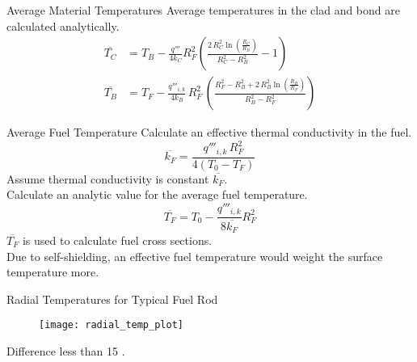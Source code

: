 \begin{frame}{Average Material Temperatures}
  Average temperatures in the clad and bond are calculated analytically.
  \begin{align}
    \label{eq:tc_bar}
    \overline{T_C} &= T_B - \frac{q'''}{4 k_C} R_F^2 \left(
      \frac{2 \, R_C^2 \ln\left(\frac{R_C}{R_B}\right)}
      {R_C^2 - R_B^2}  - 1\right) \\
    \label{eq:tb_bar}
    \overline{T_B} &= T_F - \frac{q'''_{i,k}}{4 k_B} \, R_F^2 \, \left(
      \frac{R_F^2 - R_B^2 + 2\,R_B^2 \ln\left(\frac{R_B}{R_F}\right)}
      {R_B^2-R_F^2}\right)
  \end{align}
\end{frame}

\begin{frame}{Average Fuel Temperature}
  Calculate an effective thermal conductivity in the fuel.
  \begin{equation}
    \label{eq:kfuel_constant}
    \overline{k_F} = \frac{q'''_{i,k} \, R_F^2}{4(T_0-T_F)}
  \end{equation}
  Assume thermal conductivity is constant $\overline{k_F}$.\\
  Calculate an analytic value for the average fuel temperature.
  \begin{equation}
    \label{eq:tf_bar}
    \overline{T_F} = T_0 - \frac{q'''_{i,k}}{8 \overline{k_F}} R_F^2
  \end{equation}
  $\overline{T_F}$ is used to calculate fuel cross sections. \\
  Due to self-shielding, an effective fuel temperature would weight the surface 
  temperature more.
\end{frame}

\begin{frame}{Radial Temperatures for Typical Fuel Rod}
  \begin{figure}
    \centering
    \texttt{[image: radial\_temp\_plot]}
    \label{fig:radial_temp_plot}
  \end{figure}
  \vspace{-0.2in}
  \begin{block}{}
    \centering
    Difference less than 15 .
  \end{block}
\end{frame}

